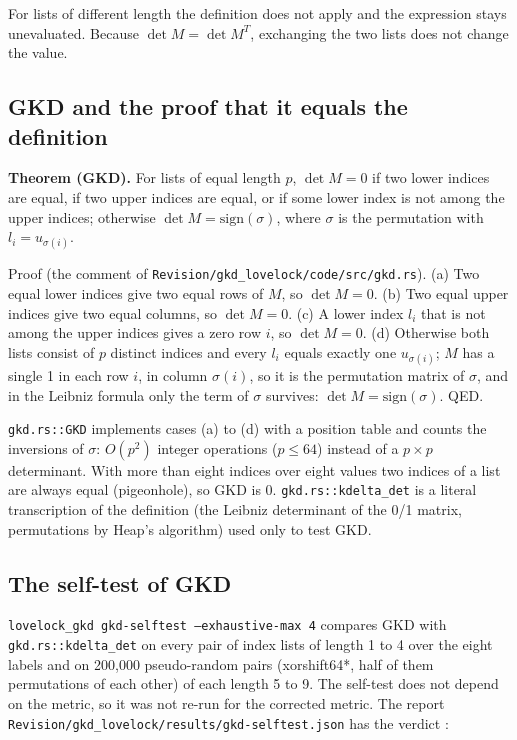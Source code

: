 \documentclass[11pt]{article}
\begin{document}
For lists of different length the definition does not apply and the expression stays unevaluated. Because $\det M = \det M^T$, exchanging the two lists does not change the value.

\subsection{GKD and the proof that it equals the definition}

\textbf{Theorem (GKD).} For lists of equal length $p$, $\det M = 0$ if two lower indices are equal, if two upper indices are equal, or if some lower index is not among the upper indices; otherwise $\det M = \mathrm{sign}(\sigma)$, where $\sigma$ is the permutation with $l_i = u_{\sigma(i)}$.

Proof (the comment of \texttt{Revision\allowbreak{}/gkd\_lov\allowbreak{}elock/co\allowbreak{}de/src/g\allowbreak{}kd.rs}). (a) Two equal lower indices give two equal rows of $M$, so $\det M = 0$. (b) Two equal upper indices give two equal columns, so $\det M = 0$. (c) A lower index $l_i$ that is not among the upper indices gives a zero row $i$, so $\det M = 0$. (d) Otherwise both lists consist of $p$ distinct indices and every $l_i$ equals exactly one $u_{\sigma(i)}$; $M$ has a single 1 in each row $i$, in column $\sigma(i)$, so it is the permutation matrix of $\sigma$, and in the Leibniz formula only the term of $\sigma$ survives: $\det M = \mathrm{sign}(\sigma)$. QED.

\texttt{gkd.rs::\allowbreak{}GKD} implements cases (a) to (d) with a position table and counts the inversions of $\sigma$: $O(p^2)$ integer operations ($p \le 64$) instead of a $p \times p$ determinant. With more than eight indices over eight values two indices of a list are always equal (pigeonhole), so GKD is 0. \texttt{gkd.rs::\allowbreak{}kdelta\_d\allowbreak{}et} is a literal transcription of the definition (the Leibniz determinant of the 0/1 matrix, permutations by Heap's algorithm) used only to test GKD.

\subsection{The self-test of GKD}

\texttt{lovelock\allowbreak{}\_gkd gkd\allowbreak{}-selftes\allowbreak{}t --exha\allowbreak{}ustive-m\allowbreak{}ax 4} compares GKD with \texttt{gkd.rs::\allowbreak{}kdelta\_d\allowbreak{}et} on every pair of index lists of length 1 to 4 over the eight labels and on 200,000 pseudo-random pairs (xorshift64*, half of them permutations of each other) of each length 5 to 9. The self-test does not depend on the metric, so it was not re-run for the corrected metric. The report \texttt{Revision\allowbreak{}/gkd\_lov\allowbreak{}elock/re\allowbreak{}sults/gk\allowbreak{}d-selfte\allowbreak{}st.json} has the verdict \texttt{}:
\end{document}
